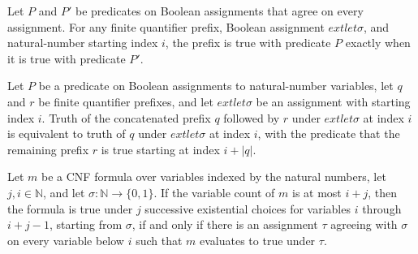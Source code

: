 \begin{theorem}
\label{Complexity.QBF.prefixTruth_congr}
\leanok
{}
Let $P$ and $P'$ be predicates on Boolean assignments that agree on every assignment.
For any finite quantifier prefix, Boolean assignment $	ext{ let }
\sigma$, and natural-number starting index $i$, the prefix is true with predicate $P$
exactly when it is true with predicate $P'$.
\end{theorem}

\begin{theorem}
\label{Complexity.QBF.prefixTruth_append}
\leanok
{}
Let $P$ be a predicate on Boolean assignments to natural-number variables, let $q$ and
$r$ be finite quantifier prefixes, and let $	ext{ let }
\sigma$ be an assignment with starting index $i$. Truth of the concatenated prefix $q$
followed by $r$ under $	ext{ let }
\sigma$ at index $i$ is equivalent to truth of $q$ under $	ext{ let }
\sigma$ at index $i$, with the predicate that the remaining prefix $r$ is true starting
at index $i+|q|$.
\end{theorem}

\begin{theorem}
\label{Complexity.QBF.truthAux_exSuffix_iff}
\leanok
{}
Let $m$ be a CNF formula over variables indexed by the natural numbers, let
$j,i\in\mathbb{N}$, and let $\sigma:\mathbb{N}\to\{0,1\}$. If the variable count of $m$
is at most $i+j$, then the formula is true under $j$ successive existential choices for
variables $i$ through $i+j-1$, starting from $\sigma$, if and only if there is an
assignment $\tau$ agreeing with $\sigma$ on every variable below $i$ such that $m$
evaluates to true under $\tau$.
\end{theorem}

